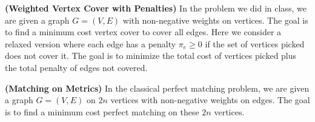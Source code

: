 \documentclass[solution,addpoints,12pt]{exam}
\begin{document}
\begin{questions}

\question[20] \textbf{(Weighted Vertex Cover with Penalties)}  In the  problem we did in class, we are given a graph $G = (V,E)$ with non-negative weights on vertices. The goal is to find a minimum cost vertex cover to cover all edges. Here we consider a relaxed version where each edge has a penalty $\pi_e \geq 0$ if the set of vertices picked does not cover it. The goal is to minimize the total cost of vertices picked plus the total penalty of edges not covered. 


\question[40] \textbf{(Matching on Metrics)}  In the classical perfect matching problem, we are given a graph $G = (V,E)$ on $2n$  vertices with non-negative weights on edges. The goal is to find a minimum cost perfect matching on these $2n$ vertices. 
\end{questions}
\end{document}
